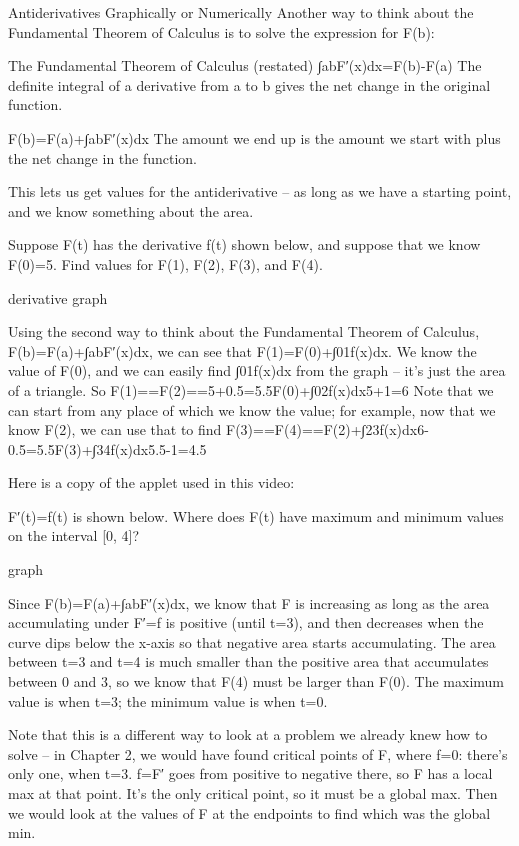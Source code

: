 Antiderivatives Graphically or Numerically
Another way to think about the Fundamental Theorem of Calculus is to solve the expression for F(b):

The Fundamental Theorem of Calculus (restated)
∫abF′(x)dx=F(b)-F(a)
The definite integral of a derivative from a to b gives the net change in the original function.

F(b)=F(a)+∫abF′(x)dx
The amount we end up is the amount we start with plus the net change in the function.

This lets us get values for the antiderivative – as long as we have a starting point, and we know something about the area.

\begin{example}
Suppose F(t) has the derivative f(t) shown below, and suppose that we know F(0)=5. Find values for F(1), F(2), F(3), and F(4).

derivative graph
\begin{solution}
Using the second way to think about the Fundamental Theorem of Calculus, F(b)=F(a)+∫abF′(x)dx, we can see that F(1)=F(0)+∫01f(x)dx. We know the value of F(0), and we can easily find ∫01f(x)dx from the graph – it's just the area of a triangle. So
F(1)==F(2)==5+0.5=5.5F(0)+∫02f(x)dx5+1=6
Note that we can start from any place of which we know the value; for example, now that we know F(2), we can use that to find
F(3)==F(4)==F(2)+∫23f(x)dx6-0.5=5.5F(3)+∫34f(x)dx5.5-1=4.5
\end{solution}\end{example}

Here is a copy of the applet used in this video:


\begin{example}
F′(t)=f(t) is shown below. Where does F(t) have maximum and minimum values on the interval [0, 4]?

graph
\begin{solution}
Since F(b)=F(a)+∫abF′(x)dx, we know that F is increasing as long as the area accumulating under F′=f is positive (until t=3), and then decreases when the curve dips below the x-axis so that negative area starts accumulating. The area between t=3 and t=4 is much smaller than the positive area that accumulates between 0 and 3, so we know that F(4) must be larger than F(0). The maximum value is when t=3; the minimum value is when t=0.
\end{solution}\end{example}

Note that this is a different way to look at a problem we already knew how to solve – in Chapter 2, we would have found critical points of F, where f=0: there's only one, when t=3. f=F′ goes from positive to negative there, so F has a local max at that point. It's the only critical point, so it must be a global max. Then we would look at the values of F at the endpoints to find which was the global min.

